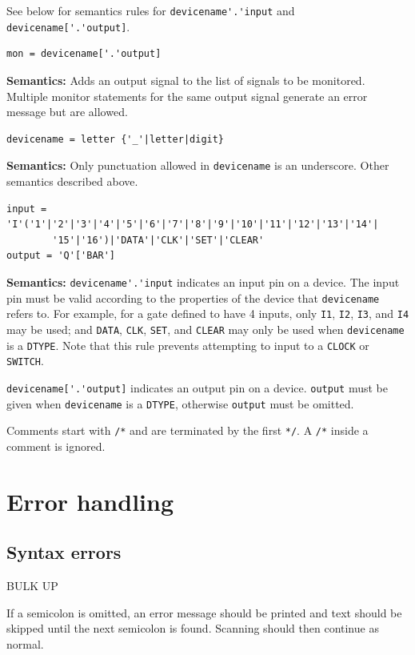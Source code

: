 \documentclass[a4paper,10pt]{article}
\begin{document}
See below for semantics rules for \verb|devicename'.'input| and \verb|devicename['.'output]|.

\begin{verbatim}
mon = devicename['.'output]
\end{verbatim} 
\textbf{Semantics:} Adds an output signal to the list of signals to be monitored. Multiple monitor statements for the same output signal generate an error message but are allowed.

\begin{verbatim}
devicename = letter {'_'|letter|digit}
\end{verbatim}
\textbf{Semantics:} Only punctuation allowed in \texttt{devicename} is an underscore. Other semantics described above.

\begin{verbatim}
input = 'I'('1'|'2'|'3'|'4'|'5'|'6'|'7'|'8'|'9'|'10'|'11'|'12'|'13'|'14'|
        '15'|'16')|'DATA'|'CLK'|'SET'|'CLEAR'
output = 'Q'['BAR']
\end{verbatim} 

\textbf{Semantics:} \verb|devicename'.'input| indicates an input pin on a device. The input pin must be valid according to the properties of the device that \texttt{devicename} refers to. For example, for a gate defined to have 4 inputs, only \texttt{I1}, \texttt{I2}, \texttt{I3}, and \texttt{I4} may be used; and \texttt{DATA}, \texttt{CLK}, \texttt{SET}, and \texttt{CLEAR} may only be used when \texttt{devicename} is a \texttt{DTYPE}.
Note that this rule prevents attempting to input to a \texttt{CLOCK} or \texttt{SWITCH}.

\verb|devicename['.'output]| indicates an output pin on a device. \texttt{output} must be given when \texttt{devicename} is a \texttt{DTYPE}, otherwise \texttt{output} must be omitted. 

Comments start with \texttt{/*} and are terminated by the first \texttt{*/}. A \texttt{/*} inside a comment is ignored. 

\section{Error handling}

\subsection{Syntax errors}

BULK UP

If a semicolon is omitted, an error message should be printed and text should be skipped until the next semicolon is found. Scanning should then continue as normal. 
\end{document}
